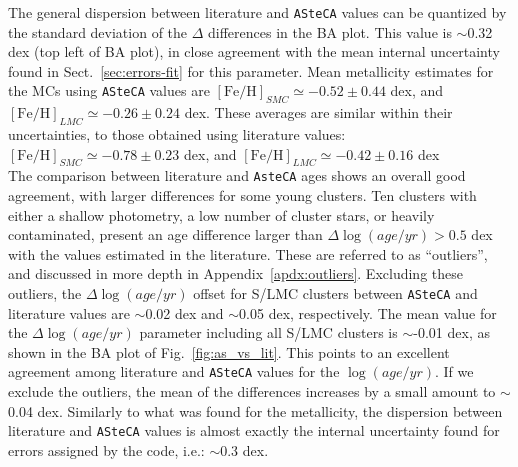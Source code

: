 \documentclass{aa}
\begin{document}
The general dispersion between literature and \texttt{ASteCA} values can be
quantized by the standard deviation of the $\Delta$ differences in the BA plot.
This value is $\sim$0.32 dex (top left of BA plot), in close agreement with the
mean internal uncertainty found in Sect.~\ref{sec:errors-fit} for this
parameter. Mean metallicity estimates for the MCs using \texttt{ASteCA} values
are $\mathrm{[Fe/H]}_{SMC}{\simeq-}0.52{\pm}0.44$ dex, and
$\mathrm{[Fe/H]}_{LMC}{\simeq-}0.26{\pm}0.24$ dex. These averages are similar
within their uncertainties, to those obtained using literature values:
$\mathrm{[Fe/H]}_{SMC}{\simeq-}0.78{\pm}0.23$ dex, and
$\mathrm{[Fe/H]}_{LMC}{\simeq-}0.42{\pm}0.16$ dex\\

The comparison between literature and \texttt{AsteCA} ages shows an overall good
agreement, with larger differences for some young clusters. Ten clusters with
either a shallow photometry, a low number of cluster stars, or heavily
contaminated, present an age difference larger than $\Delta \log(age/yr){>}0.5$
dex with the values estimated in the literature.
These are referred to as ``outliers'', and discussed in more depth in
Appendix~\ref{apdx:outliers}.
%
%
Excluding these outliers, the $\Delta \log(age/yr)$ offset for S/LMC clusters
between \texttt{ASteCA} and literature values are $\sim$0.02 dex and $\sim$0.05
dex, respectively.
The mean value for the $\Delta \log(age/yr)$ parameter including all S/LMC
clusters is $\sim$-0.01 dex, as shown in the BA plot of
Fig.~\ref{fig:as_vs_lit}. This points to an excellent agreement among
literature and \texttt{ASteCA} values for the $\log(age/yr)$.
If we exclude the outliers, the mean of the differences increases by a small
amount to $\sim$0.04 dex.
Similarly to what was found for the metallicity, the dispersion between
literature and \texttt{ASteCA} values is almost exactly the internal uncertainty
found for errors assigned by the code, i.e.: $\sim$0.3 dex.\\
\end{document}
